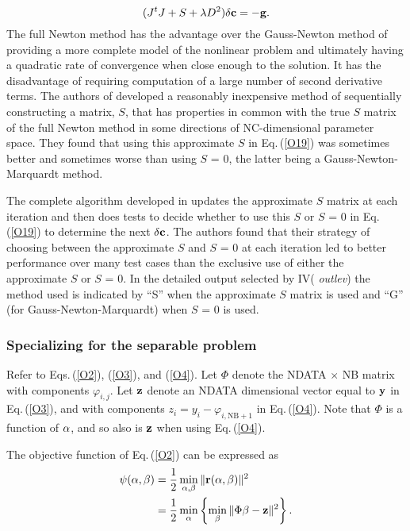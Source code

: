 \documentclass[twoside]{MATH77}
\begin{document}
\begin{equation}
\label{O19}(J^tJ+S+\lambda D^2){\bf \delta c}=-{\bf g.}
\end{equation}
The full Newton method has the advantage over the Gauss-Newton method of
providing a more complete model of the nonlinear problem and ultimately
having a quadratic rate of convergence when close enough to the solution.
It has the disadvantage of requiring computation of a large number of
second derivative terms.  The authors of \cite{Dennis:1981:ANL} developed
a reasonably inexpensive method of sequentially constructing a matrix,
$S$, that has properties in common with the true $S$ matrix of the full
Newton method in some directions of NC-dimensional parameter space.  They
found that using this approximate $S$ in Eq.\,(\ref{O19}) was sometimes
better and sometimes worse than using $S$ = 0, the latter being a
Gauss-Newton-Marquardt method.

The complete algorithm developed in \cite{Dennis:1981:ANL} updates the
approximate $S$ matrix at each iteration and then does tests to decide
whether to use this $S$ or $S$ = 0 in Eq.\,(\ref{O19}) to determine the
next ${\bf \delta c}$.  The authors found that their strategy of choosing
between the approximate $S$ and $S$ = 0 at each iteration led to better
performance over many test cases than the exclusive use of either the
approximate $S$ or $S$ = 0.  In the detailed output selected by IV({\em
outlev}) the method used is indicated by ``S'' when the approximate $S$
matrix is used and ``G'' (for Gauss-Newton-Marquardt) when $S$ = 0 is
used.

\subsubsection{Specializing for the separable problem}

Refer to Eqs.\,(\ref{O2}), (\ref{O3}), and (\ref{O4}). Let $\Phi $ denote the
NDATA $\times $ NB matrix with components $\varphi _{i,j}$. Let ${\bf z}$
denote an NDATA dimensional vector equal to ${\bf y}$ in Eq.\,(\ref{O3}), and
with components $z_i=y_i-\varphi _{i,\text{NB}+1}$ in Eq.\,(\ref{O4}). Note that
$\Phi $ is a function of ${\bf \alpha }$, and so also is ${\bf z}$ when
using Eq.\,(\ref{O4}).

The objective function of Eq.\,(\ref{O2}) can be expressed as
\begin{equation}
\label{O20}
\begin{split}
\psi (
{\bf \alpha },{\bf \beta })&=\frac 12\min _{{\bf \alpha },{\bf \beta }}\|
{\bf r}({\bf \alpha },{\bf \beta })\| ^2\vspace{2pt} \\
&=\frac 12\min _{{\bf \alpha }}\left\{ \min _{{\bf \beta }}\|
\Phi {\bf \beta }-{\bf z}\|^2\right\} .
\end{split}
\end{equation}
\end{document}
